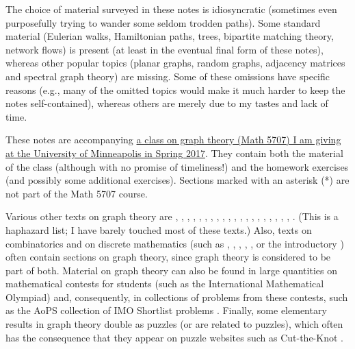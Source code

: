 \documentclass[numbers=enddot,12pt,final,onecolumn,notitlepage]{scrartcl}%
\theoremstyle{definition}
\begin{document}
The choice of material surveyed in these notes is idiosyncratic
(sometimes even purposefully trying to wander some seldom trodden
paths). Some standard material (Eulerian walks, Hamiltonian paths,
trees, bipartite matching theory, network flows) is present (at least
in the eventual final form of these notes), whereas
other popular topics (planar graphs, random graphs, adjacency matrices
and spectral graph theory) are missing. Some of these omissions have
specific reasons (e.g., many of the omitted topics would make it much
harder to keep the notes self-contained), whereas others are merely
due to my tastes and lack of time.

These notes are accompanying
\href{http://www.math.umn.edu/~dgrinber/5707s17/}{a
class on graph theory (Math 5707) I am giving at the University of
Minneapolis in Spring 2017}. They contain both the
material of the class (although with no promise of timeliness!) and the
homework exercises (and possibly some additional exercises).
Sections marked with an asterisk (*) are not part of the Math 5707
course.

Various other texts on graph theory are \cite{Bollob79},
\cite{Bollob98}, \cite{Harary69}, \cite{Harju14}, \cite{Balakr97},
\cite{Jungni13}, \cite{Martin16}, \cite{ThuSwa92},
\cite{BonMur76}, \cite{Ore74}, \cite{BehCha71}, \cite{BeChZh15},
\cite{BonMur08}, \cite{Ruohon13}, \cite{Dieste16}, \cite{Ore90},
\cite{HaHiMo08}, \cite{Berge91}, \cite{ChaLes15}, \cite{Griffi15},
\cite{Wilson96}.
(This is a haphazard list; I have barely touched most of these texts.)
Also, texts on combinatorics and on discrete mathematics (such as
\cite{BenWil12}, \cite{KelTro15}, \cite{PoTaWo83}, \cite{Bona11},
\cite{Guicha16},
or the introductory \cite{LoPeVe03}) often contain
sections on graph theory, since graph theory is considered to be part
of both.
Material on graph theory can also be found in large quantities on
mathematical contests for students (such as the International
Mathematical Olympiad) and, consequently, in collections of problems
from these contests, such as the AoPS collection of IMO Shortlist
problems \cite{AoPS-ISL}.
Finally, some elementary results in graph theory double as puzzles
(or are related to puzzles), which often has the consequence that they
appear on puzzle websites such as Cut-the-Knot \cite{cut-the-knot}.
\end{document}
